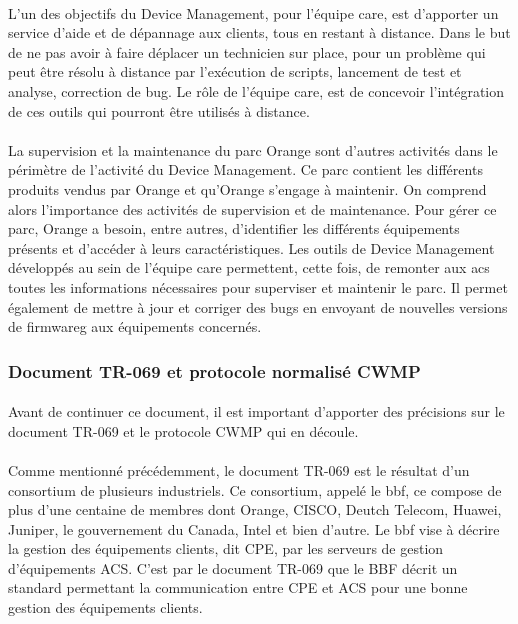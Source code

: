 \documentclass[12pt,a4paper]{report}
\begin{document}
\paragraph*{}
L’un des objectifs du Device Management, pour l’équipe \gls{care}, est d’apporter un service d’aide et de dépannage aux clients, tous en restant à distance. Dans le but de ne pas avoir à faire déplacer un technicien sur place, pour un problème qui peut être résolu à distance par l’exécution de scripts, lancement de test et analyse, correction de bug. Le rôle de l’équipe \gls{care}, est de concevoir l’intégration de ces outils qui pourront être utilisés à distance.
\paragraph*{}
La supervision et la maintenance du parc Orange sont d’autres activités dans le
périmètre de l’activité du Device Management. Ce parc contient les différents produits vendus par Orange et qu’Orange s’engage à maintenir. On comprend alors l’importance des activités de supervision et de maintenance. Pour gérer ce parc, Orange a besoin, entre autres, d’identifier les différents équipements présents et d’accéder à leurs  caractéristiques. Les outils de Device Management  développés au sein de l’équipe \gls{care} permettent, cette fois, de remonter aux \gls{acs} toutes les informations nécessaires pour superviser et maintenir le parc. Il permet également de mettre à jour et corriger des bugs en envoyant de nouvelles versions de \gls{firmwareg} aux équipements concernés. \\

\subsubsection{Document TR-069 et protocole normalisé CWMP}
\paragraph*{} Avant de continuer ce document, il est important d'apporter des précisions sur le document TR-069 et le protocole CWMP qui en découle. 
\paragraph*{}Comme mentionné précédemment, le document TR-069 est le résultat d'un consortium de plusieurs industriels. Ce consortium, appelé le \gls{bbf}, ce compose de plus d'une centaine de membres dont Orange, CISCO, Deutch Telecom, Huawei, Juniper, le gouvernement du Canada, Intel et bien d'autre. Le \gls{bbf} vise à décrire la gestion des équipements clients, dit CPE, par les serveurs de gestion d'équipements ACS. C'est par le document TR-069 que le BBF décrit un standard permettant la communication entre CPE et ACS pour une bonne gestion des équipements clients.
\end{document}
